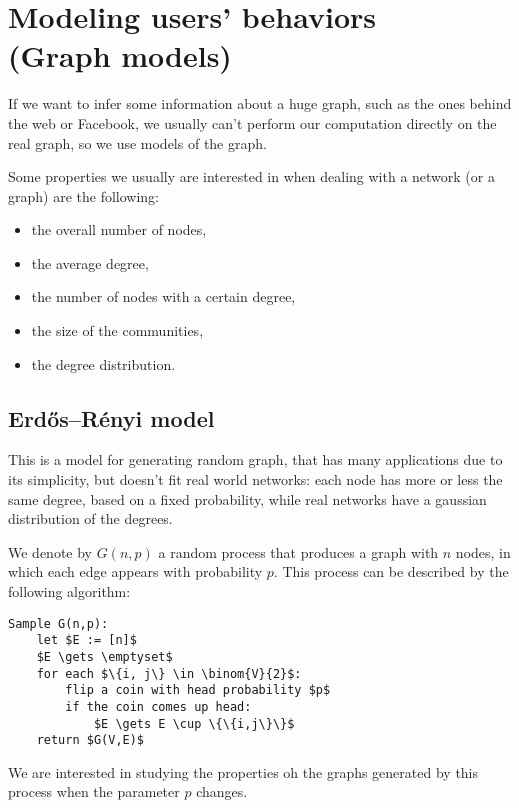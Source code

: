 \chapter[Modeling users' behaviors - Graph models]{Modeling users' behaviors \\ \LARGE(Graph models)}\label{sec:users-behaviors}

    If we want to infer some information about a huge graph, such as the ones behind the web or Facebook, we usually can't perform our computation directly on the real graph, so we use models of the graph.

    Some properties we usually are interested in when dealing with a network (or a graph) are the following:
    \begin{itemize}
        \item the overall number of nodes,
        \item the average degree,
        \item the number of nodes with a certain degree,
        \item the size of the communities,
        \item the degree distribution.
    \end{itemize}


\section{Erd\H{o}s–Rényi model}\label{sec:gnp}
    
    This is a model for generating random graph, that has many applications due to its simplicity, but doesn't fit real world networks: each node has more or less the same degree, based on a fixed probability, while real networks have a gaussian distribution of the degrees.
    
    We denote by $G(n, p)$ a random process that produces a graph with $n$ nodes, in which each edge appears with probability $p$. This process can be described by the following algorithm:
    \begin{lstlisting}[caption={The G(n,p) algorithm},label={lst:gnp}]
Sample G(n,p):
    let $E := [n]$
    $E \gets \emptyset$
    for each $\{i, j\} \in \binom{V}{2}$:
        flip a coin with head probability $p$
        if the coin comes up head:
            $E \gets E \cup \{\{i,j\}\}$
    return $G(V,E)$
    \end{lstlisting}
    
    We are interested in studying the properties oh the graphs generated by this process when the parameter $p$ changes.
    

